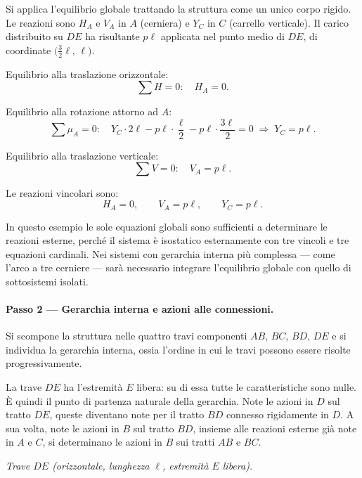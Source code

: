 Si applica l'equilibrio globale trattando la
struttura come un unico corpo rigido.
Le reazioni sono $H_A$ e $V_A$ in $A$
(cerniera) e $Y_C$ in $C$ (carrello verticale).
Il carico distribuito su $DE$ ha risultante
$p\ell$ applicata nel punto medio di $DE$,
di coordinate $\bigl(\tfrac{3}{2}\ell,\,\ell\bigr)$.

\noindent Equilibrio alla traslazione orizzontale:
\[
\sum H = 0:\quad H_A = 0.
\]

\noindent Equilibrio alla rotazione attorno ad $A$:
\[
\sum \mu_A = 0:\quad
Y_C \cdot 2\ell
- p\ell \cdot \frac{\ell}{2}
- p\ell \cdot \frac{3\ell}{2} = 0
\;\Rightarrow\;
Y_C = p\ell.
\]

\noindent Equilibrio alla traslazione verticale:
\[
\sum V = 0:\quad
V_A = p\ell.
\]

Le reazioni vincolari sono:
\[
H_A = 0, \qquad V_A = p\ell, \qquad Y_C = p\ell.
\]

In questo esempio le sole equazioni globali
sono sufficienti a determinare le reazioni
esterne, perché il sistema è isostatico
esternamente con tre vincoli e tre equazioni
cardinali. Nei sistemi con gerarchia interna
più complessa --- come l'arco a tre cerniere
--- sarà necessario integrare l'equilibrio
globale con quello di sottosistemi isolati.

\paragraph{Passo 2 --- Gerarchia interna e azioni
	alle connessioni.}

Si scompone la struttura nelle quattro travi
componenti $AB$, $BC$, $BD$, $DE$ e si
individua la gerarchia interna, ossia l'ordine
in cui le travi possono essere risolte
progressivamente.

La trave $DE$ ha l'estremità $E$ libera: su
di essa tutte le caratteristiche sono nulle.
È quindi il punto di partenza naturale della
gerarchia. Note le azioni in $D$ sul tratto
$DE$, queste diventano note per il tratto $BD$
connesso rigidamente in $D$. A sua volta,
note le azioni in $B$ sul tratto $BD$, insieme
alle reazioni esterne già note in $A$ e $C$,
si determinano le azioni in $B$ sui tratti
$AB$ e $BC$.



\medskip
\noindent\textit{Trave $DE$ (orizzontale,
	lunghezza $\ell$, estremità $E$ libera).}

